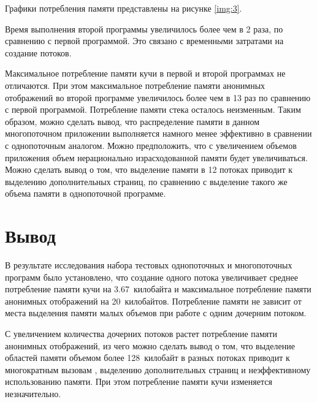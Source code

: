 Графики потребления памяти представлены на рисунке \ref{img:3}.

Время выполнения второй программы увеличилось более чем в 2 раза, по сравнению с первой программой. Это связано с временн\textit{ы}ми затратами на создание потоков.

Максимальное потребление памяти кучи в первой и второй программах не отличаются. При этом максимальное потребление памяти анонимных отображений во второй программе увеличилось более чем в 13 раз по сравнению с первой программой. Потребление памяти стека осталось неизменным. Таким образом, можно сделать вывод, что распределение памяти в данном многопоточном приложении выполняется намного менее эффективно в сравнении с однопоточным аналогом. Можно предположить, что с увеличением объемов приложения объем нерационально израсходованной памяти будет увеличиваться. Можно сделать вывод о том, что выделение памяти в 12 потоках приводит к выделению дополнительных страниц, по сравнению с выделение такого же объема памяти в однопоточной программе.


\section{Вывод}

В результате исследования набора тестовых однопоточных и многопоточных программ было установлено, что создание одного потока увеличивает среднее потребление памяти кучи на 3.67~килобайта и максимальное потребление памяти анонимных отображений на 20~килобайтов. Потребление памяти не зависит от места выделения памяти малых объемов при работе с одним дочерним потоком.

С увеличением количества дочерних потоков растет потребление памяти анонимных отображений, из чего можно сделать вывод о том, что выделение областей памяти объемом более 128~килобайт в разных потоках приводит к многократным вызовам , выделению дополнительных страниц и неэффективному использованию памяти. При этом потребление памяти кучи изменяется незначительно.